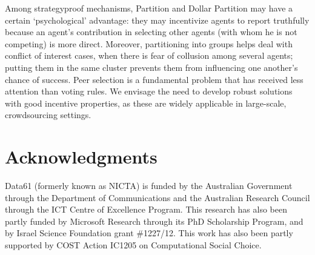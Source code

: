 \documentclass[letterpaper]{article}
\begin{document}
Among strategyproof mechanisms, Partition and Dollar Partition may 
have a certain `psychological' advantage: they may incentivize agents to report truthfully because an agent's contribution in selecting other agents (with whom he is not competing) is more direct.
Moreover, partitioning into groups helps deal with conflict of interest cases, when there is fear of collusion among several agents; putting them in the same cluster prevents them from influencing one another's chance of success.
Peer selection is a fundamental problem that has received less attention than voting rules.  We envisage the need to develop robust solutions with good incentive properties, as these are widely applicable in large-scale, crowdsourcing settings.

\section*{Acknowledgments}
Data61 (formerly known as NICTA) is funded by the Australian Government through the Department of Communications and the Australian Research Council through the ICT Centre of Excellence Program. This research has also been partly funded by Microsoft Research through its PhD Scholarship Program, and by Israel Science Foundation grant \#1227/12. This work has also been partly supported by COST Action IC1205 on Computational Social Choice.

\normalsize


\end{document}
